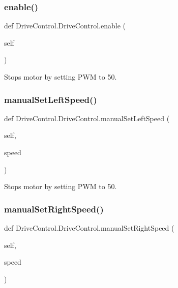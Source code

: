 \subsubsection{\texorpdfstring{enable()}{enable()}}
{\footnotesize\ttfamily def Drive\+Control.\+Drive\+Control.\+enable (\begin{DoxyParamCaption}\item[{}]{self }\end{DoxyParamCaption})}



Stops motor by setting P\+WM to 50. 

\mbox{\label{classDriveControl_1_1DriveControl_a9c69343ba41e89f227bbf8e6681de2c0}} 
\subsubsection{\texorpdfstring{manual\+Set\+Left\+Speed()}{manualSetLeftSpeed()}}
{\footnotesize\ttfamily def Drive\+Control.\+Drive\+Control.\+manual\+Set\+Left\+Speed (\begin{DoxyParamCaption}\item[{}]{self,  }\item[{}]{speed }\end{DoxyParamCaption})}



Stops motor by setting P\+WM to 50. 

\mbox{\label{classDriveControl_1_1DriveControl_a418d77b55117f63f058e63345e9e0035}} 
\subsubsection{\texorpdfstring{manual\+Set\+Right\+Speed()}{manualSetRightSpeed()}}
{\footnotesize\ttfamily def Drive\+Control.\+Drive\+Control.\+manual\+Set\+Right\+Speed (\begin{DoxyParamCaption}\item[{}]{self,  }\item[{}]{speed }\end{DoxyParamCaption})}



